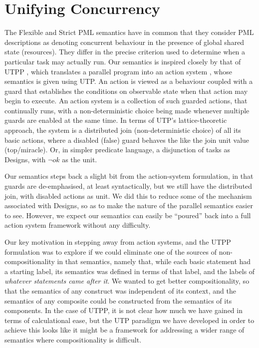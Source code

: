 \section{Unifying Concurrency}\label{ha:UTCP}


The Flexible and Strict PML semantics have in common that they
consider PML descriptions as denoting concurrent behaviour in the
presence of global shared state (resources).
They differ in the precise criterion used to determine when a particular task may actually run.
Our semantics is inspired closely by that of
UTPP \cite{DBLP:conf/icfem/WoodcockH02},
which translates a parallel program into an action system \cite{PODC::BackK1983},
whose semantics is given using UTP.
An action is viewed as a behaviour coupled with a guard that
establishes the conditions on observable state when that action may
begin to execute. An action system is a collection of such guarded actions,
that continually runs, with a non-deterministic choice being made whenever
multiple guards are enabled at the same time\cite{1976:book:dijkstra}.
In terms of UTP's lattice-theoretic approach,
the system is a distributed join (non-deterministic choice) of all its basic actions,
where a disabled (false) guard behaves the like the join unit value (top/miracle).
Or, in simpler predicate language, a disjunction of tasks as Designs,
with $\lnot ok$ as the unit.


Our semantics steps back a slight bit from the action-system formulation,
in that guards are de-emphasised, at least syntactically,
but we still have the distributed join, with disabled actions as unit.
We did this to reduce some of the mechanism associated with Designs,
so as to make the nature of the parallel semantics easier to see.
However, we expect our semantics can easily be ``poured'' back into a
full action system framework without any difficulty.

Our key motivation in stepping away from action systems,
and the UTPP formulation was to explore if we could eliminate one of the
sources of non-compositionality in that semantics,
namely that, while each basic statement had a starting label,
its semantics was defined in terms of that label,
and the labels of \emph{whatever statements came after it}.
We wanted to get better compositionality, so that the semantics of any construct was independent of its context,
and the semantics of any composite could be constructed from
the semantics of its components.
In the case of UTPP, it is not clear how much we have gained in terms
of calculational ease, but the UTP paradigm we have developed in order to
achieve this looks like it might be a framework for addressing a wider range of semantics where compositionality is difficult.



